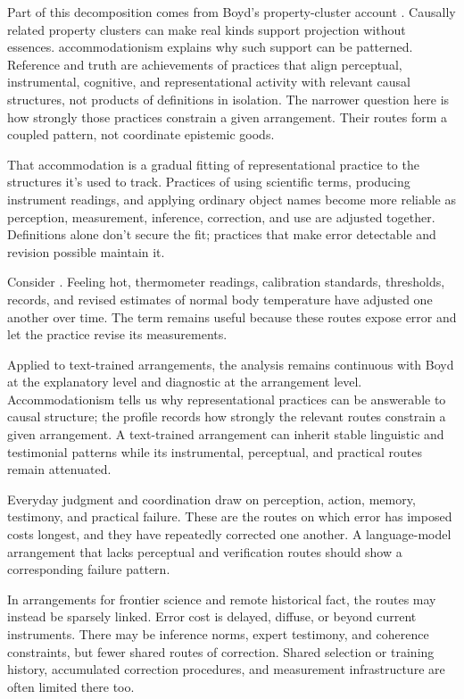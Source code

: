 \documentclass[12pt]{article}
\begin{document}
Part of this decomposition comes from Boyd's property-cluster account
\citep{boyd1991,boyd1999}. Causally related property clusters can make real kinds support
projection without essences.
 accommodationism explains
why such support can be patterned. Reference and truth are achievements of practices that
align perceptual, instrumental, cognitive, and representational activity with relevant
causal structures, not products of definitions in isolation. The narrower question here is
how strongly those practices constrain a given arrangement. Their routes form a coupled
pattern, not coordinate epistemic goods.

That accommodation is a gradual fitting of representational practice to the
structures it's used to track. Practices of using scientific terms, producing instrument
readings, and applying ordinary object names become more reliable as perception,
measurement, inference, correction, and use are adjusted together. Definitions alone don't
secure the fit; practices that make error detectable and revision possible maintain it.

Consider . Feeling hot, thermometer readings,
calibration standards, thresholds, records, and revised estimates of normal body
temperature have adjusted one another over time. The term remains useful because these
routes expose error and let the practice revise its measurements.

Applied to text-trained arrangements, the analysis remains continuous with Boyd at the
explanatory level and diagnostic at the arrangement level. Accommodationism tells us why
representational practices can be answerable to causal structure; the profile records how
strongly the relevant routes constrain a given arrangement. A text-trained arrangement can
inherit stable linguistic and testimonial patterns while its
instrumental, perceptual, and practical routes remain attenuated.

Everyday judgment and coordination draw on perception, action, memory, testimony, and
practical failure. These are the routes on which error has imposed costs longest, and they
have repeatedly corrected one another. A language-model arrangement that lacks perceptual
and verification routes should show a corresponding failure pattern.

In arrangements for frontier science and remote historical fact, the routes may instead be
sparsely linked. Error cost is delayed, diffuse, or beyond current instruments. There may be
inference norms, expert testimony, and coherence constraints, but fewer shared routes of
correction. Shared selection or training history, accumulated correction procedures, and
measurement infrastructure are often limited there too.
\end{document}
